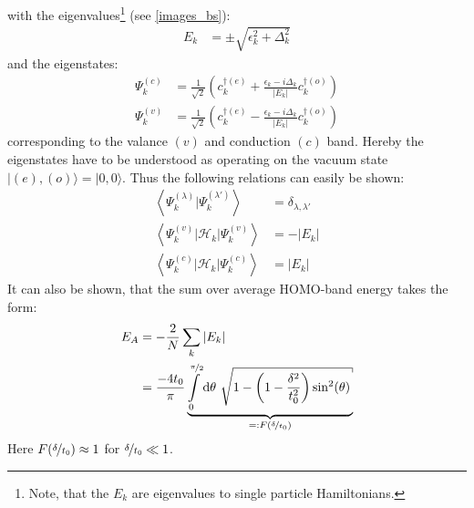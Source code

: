with the eigenvalues\footnote{Note, that the $E_k$ are eigenvalues to single particle Hamiltonians.} (see \cref{images_bs}):
\begin{align}
	E_k &= \pm \sqrt{\epsilon_k^2+\Delta_k^2}
	\label{equation_energy_band}
\end{align}
and the eigenstates:
\begin{align}
	\Psi_k^{(c)} &= \frac{1}{\sqrt{2}}\left(c_k^{\dagger(e)}+\frac{\epsilon_k - i \Delta_k}{|E_k|}c_{k}^{\dagger(o)}\right)
	\label{equation_conduction_eigenstate}\\
	\Psi_k^{(v)} &= \frac{1}{\sqrt{2}}\left(c_k^{\dagger(e)}-\frac{\epsilon_k - i \Delta_k}{|E_k|}c_{k}^{\dagger(o)}\right)
	\label{equation_valence_eigenstate}
\end{align}
corresponding to the valance $(v)$ and conduction $(c)$ band. Hereby the eigenstates have to be understood as operating on the vacuum state $|(e),(o)\rangle = |0,0\rangle$. Thus the following relations can easily be shown:
\begin{align}
	\left\langle\Psi_k^{(\lambda)}\Big|\Psi_k^{(\lambda\prime)}\right\rangle &= \delta_{\lambda,\lambda\prime}\\
	\left\langle\Psi_k^{(v)}\Big|\mathcal{H}_{k}\Big|\Psi_k^{(v)}\right\rangle &= - |E_k|\\
	\left\langle\Psi_k^{(c)}\Big|\mathcal{H}_{k}\Big|\Psi_k^{(c)}\right\rangle &= |E_k|
\end{align}
It can also be shown, that the sum over average HOMO-band energy takes the form:
\begin{align}
E_A &=-\frac{2}{N}\sum_k |E_k|\\
&=\frac{-4t_0}{\pi}\underbrace{\int\limits_{0}^{\nicefrac{\pi}{2}}\text{d}\theta\ \sqrt{1-\left(1-\frac{\delta^2}{t_0^2}\right)\sin^2(\theta)}}_{=:F(\nicefrac{\delta}{t_0})}
\end{align}
Here $F\left(\nicefrac{\delta}{t_0}\right)\approx 1$ for $\nicefrac{\delta}{t_0} \ll 1$.